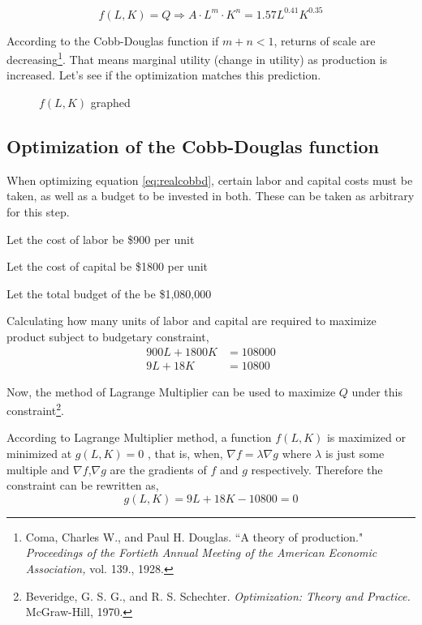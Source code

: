 \documentclass[a4paper,12pt]{article}
\theoremstyle{definition}
\begin{document}
\begin{equation}\label{eq:realcobbd}
	f(L,K)=Q \Rightarrow A \cdot L^m \cdot K^n = 1.57L^{0.41}K^{0.35}
\end{equation}

According to the Cobb-Douglas function if $m+n < 1$, returns of scale are decreasing\footnote{Coma, Charles W., and Paul H. Douglas. ``A theory of production." \textit{Proceedings of the Fortieth Annual Meeting of the American Economic Association,} vol. 139., 1928.}. That means marginal utility (change in utility) as production is increased. Let's see if the optimization matches this prediction.

\begin{figure}[H]
\centering
{}
\caption{$f(L,K)$ graphed}
\end{figure}

\subsection{Optimization of the Cobb-Douglas function}\label{sec:cobbdopt}
When optimizing equation \eqref{eq:realcobbd}, certain labor and capital costs must be taken, as well as a budget to be invested in both. These can be taken as arbitrary for this step.

Let the cost of labor be \$900 per unit

Let the cost of capital be \$1800 per unit

Let the total budget of the be \$1,080,000

Calculating how many units of labor and capital are required to maximize product subject to budgetary constraint,
\begin{equation}
\begin{split}
		900L+1800K &= 108000 \\
		9L+18K &= 10800
\end{split}
\end{equation}

Now, the method of Lagrange Multiplier can be used to maximize $Q$ under this constraint\footnote{Beveridge, G. S. G., and R. S. Schechter. \textit{Optimization: Theory and Practice.} McGraw-Hill, 1970.}.

According to Lagrange Multiplier method, a function $f(L,K)$ is maximized or minimized at $g(L,K)=0$ , that is, when, $\nabla f = \lambda \nabla g$ where $\lambda$ is just some multiple and $\nabla f$,$\nabla g$ are the gradients of $f$ and $g$ respectively. Therefore the constraint can be rewritten as,
\begin{equation}\label{eq:constraint}
	g(L,K)=9L+18K-10800=0
\end{equation}
\end{document}
